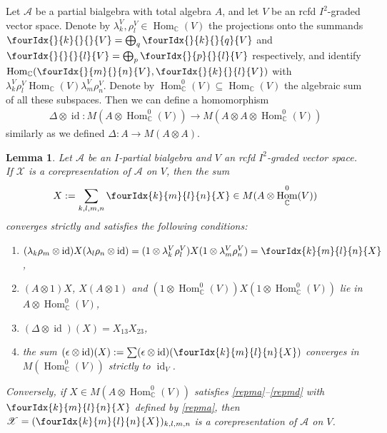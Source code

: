 \documentclass[10pt]{article}
\DeclareMathOperator{\id}{id}
\DeclareMathOperator{\Hom}{Hom}
\newcommand{\C}{\mathbb{C}}
\newcommand{\Gr}[5]{\fourIdx{#2}{#4}{#3}{#5}{#1}}%
\newcommand{\Gru}[3]{\Gr{#1}{}{}{#2}{#3}}
\newtheorem{Lem}[Theorem]{Lemma}
\theoremstyle{definition}
\numberwithin{equation}{section}
\begin{document}
Let $\mathscr{A}$ be a partial bialgebra with total algebra $A$, and
let $V$ be an rcfd $I^{2}$-graded vector space.
Denote by $\lambda^{V}_{k},\rho^{V}_{l} \in \Hom_{\C}(V)$ the
projections onto the summands $\Gru{V}{k}{} = \bigoplus_{q}
\Gru{V}{k}{q}$ and $\Gru{V}{}{l}=\bigoplus_{p}\Gru{V}{p}{l}$
respectively, and identify $\Hom_{\C}(\Gru{V}{m}{n},\Gru{V}{k}{l})$ with
$\lambda^{V}_{k}\rho^{V}_{l}\Hom_{\C}(V)\lambda^{V}_{m}\rho^{V}_{n}$. Denote by $\Hom_{\C}^{0}(V) \subseteq \Hom_{\C}(V)$ the algebraic sum of all
these subspaces. Then we can define a homomorphism
\begin{align*}
  \Delta \otimes \id \colon M(A \otimes \Hom_{\C}^{0}(V)) \to M(A
  \otimes A \otimes \Hom_{\C}^{0}(V))
\end{align*}
similarly as we defined $ \Delta \colon A \to M(A\otimes A)$.
\begin{Lem} \label{lemma:rep-multiplier}
  Let  $\mathscr{A}$ be an $I$-partial bialgebra and $V$  an rcfd $I^{2}$-graded vector space.  If $\mathscr{X}$ is a
  corepresentation of  $\mathscr{A}$ on $V$, then the sum
  \begin{align}
    \label{eq:rep-multiplier}
  X:=\sum_{k,l,m,n} \Gr{X}{k}{l}{m}{n} \in  M(A
  \otimes \Hom_{\C}^{0}(V))
  \end{align}
 converges strictly and satisfies the following conditions:
  \begin{enumerate}[label=(\arabic*)] 
  \item\label{repma} $(\lambda_{k}\rho_{m} \otimes \id){X}(\lambda_{l}\rho_{n}
    \otimes \id) = (1 \otimes \lambda^{V}_{k}\rho^{V}_{l}){X}(1 \otimes
    \lambda^{V}_{m}\rho^{V}_{n}) = \Gr{X}{k}{l}{m}{n}$,
  \item\label{repmb} $(A \otimes 1){X}$, $ {X}(A \otimes 1)$ and $(1 \otimes
    \Hom^{0}_{\C}(V))X(1 \otimes \Hom^{0}_{\C}(V))$ lie in $A \otimes \Hom_{\C}^{0}(V)$,
  \item\label{repmc} $(\Delta\otimes \id)(X)=X_{13}X_{23}$, 
  \item\label{repmd} the sum $(\epsilon \otimes \id)({X}) :=\sum (\epsilon \otimes
    \id)(\Gr{X}{k}{l}{m}{n})$ converges in $M(\Hom^{0}_{\C}(V))$ strictly
    to $\id_{V}$.
  \end{enumerate}
  Conversely, if $ X \in M(A \otimes \Hom_{\C}^{0}(V))$ satisfies
  \ref{repma}--\ref{repmd} with $\Gr{X}{k}{l}{m}{n}$ defined by \ref{repma}, then
  $\mathscr{X}=(\Gr{X}{k}{l}{m}{n})_{k,l,m,n}$ is a corepresentation
  of $\mathscr{A}$ on $V$.
\end{Lem}
\end{document}
